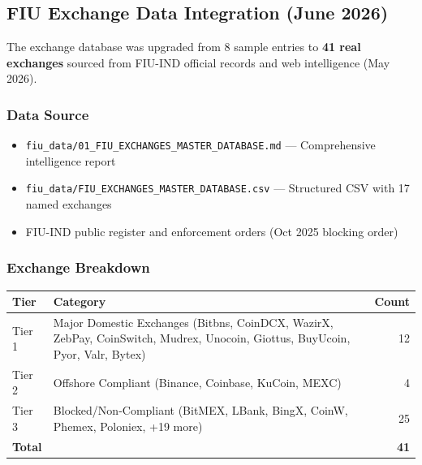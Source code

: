 \documentclass[12pt,a4paper]{article}
\begin{document}
\subsection{FIU Exchange Data Integration (June 2026)}

The exchange database was upgraded from 8 sample entries to \textbf{41 real exchanges} sourced from FIU-IND official records and web intelligence (May 2026).

\subsubsection*{Data Source}
\begin{itemize}[nosep]
    \item \texttt{fiu\_data/01\_FIU\_EXCHANGES\_MASTER\_DATABASE.md} — Comprehensive intelligence report
    \item \texttt{fiu\_data/FIU\_EXCHANGES\_MASTER\_DATABASE.csv} — Structured CSV with 17 named exchanges
    \item FIU-IND public register and enforcement orders (Oct 2025 blocking order)
\end{itemize}

\subsubsection*{Exchange Breakdown}
\begin{center}
\begin{tabular}{llr}
\toprule
\textbf{Tier} & \textbf{Category} & \textbf{Count} \\
\midrule
Tier 1 & Major Domestic Exchanges (Bitbns, CoinDCX, WazirX, ZebPay, CoinSwitch, Mudrex, Unocoin, Giottus, BuyUcoin, Pyor, Valr, Bytex) & 12 \\
Tier 2 & Offshore Compliant (Binance, Coinbase, KuCoin, MEXC) & 4 \\
Tier 3 & Blocked/Non-Compliant (BitMEX, LBank, BingX, CoinW, Phemex, Poloniex, +19 more) & 25 \\
\midrule
\textbf{Total} & & \textbf{41} \\
\bottomrule
\end{tabular}
\end{center}
\end{document}

